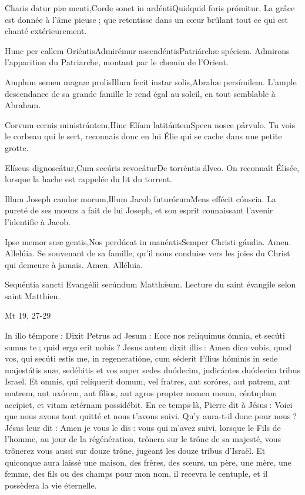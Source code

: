 \begin{paracol}{2}
Charis datur piæ menti,Corde sonet in ardéntiQuidquid foris prómitur.
\switchcolumn
La grâce est donnée à l’âme pieuse ; que retentisse dans un cœur brûlant tout ce qui est chanté extérieurement.
\switchcolumn*

Hunc per callem OriéntisAdmirémur ascendéntisPatriárchæ spéciem.
\switchcolumn
Admirons l’apparition du Patriarche, montant par le chemin de l’Orient.
\switchcolumn*

Amplum semen magnæ prolisIllum fecit instar solis,Abrahæ persímilem.
\switchcolumn
L’ample descendance de sa grande famille le rend égal au soleil, en tout semblable à Abraham.
\switchcolumn*

Corvum cernis ministrántem,Hinc Elíam latitántemSpecu nosce párvulo.
\switchcolumn
Tu vois le corbeau qui le sert, reconnais donc en lui Élie qui se cache dans une petite grotte.
\switchcolumn*

Elíseus dignoscátur,Cum secúris revocáturDe torréntis álveo.
\switchcolumn
On reconnaît Élisée, lorsque la hache est rappelée du lit du torrent.
\switchcolumn*

Illum Joseph candor morum,Illum Jacob futurórumMens effécit cónscia.
\switchcolumn
La pureté de ses mœurs a fait de lui Joseph, et son esprit connaissant l’avenir l’identifie à Jacob.
\switchcolumn*

Ipse memor suæ gentis,Nos perdúcat in manéntisSemper Christi gáudia. Amen. Allelúia.
\switchcolumn
Se souvenant de sa famille, qu’il nous conduise vers les joies du Christ qui demeure à jamais. Amen. Alléluia.
\switchcolumn*

Sequéntia sancti Evangélii secúndum Matthǽum.
\switchcolumn
Lecture du saint évangile selon saint Matthieu.
\switchcolumn*

Mt 19, 27-29
\switchcolumn

\switchcolumn*

In illo témpore : Dixit Petrus ad  Jesum : Ecce nos relíquimus ómnia, et secúti sumus te ; quid ergo erit nobis ? Jesus autem dixit illis : Amen dico vobis, quod vos, qui secúti estis me, in regeneratióne, cum séderit Fílius hóminis in sede majestátis suæ, sedébitis et vos super sedes duódecim, judicántes duódecim tribus Israel. Et omnis, qui relíquerit domum, vel fratres, aut soróres, aut patrem, aut matrem, aut uxórem, aut fílios, aut agros propter nomen meum, céntuplum accípiet, et vitam ætérnam possidébit.
\switchcolumn
En ce temps-là, Pierre dit à Jésus : Voici  que nous avons tout quitté et nous t’avons suivi. Qu’y aura-t-il donc pour nous ? Jésus leur dit : Amen je vous le dis : vous qui m’avez suivi, lorsque le Fils de l’homme, au jour de la régénération, trônera sur le trône de sa majesté, vous trônerez vous aussi sur douze trône, jugeant les douze tribus d’Israël. Et quiconque aura laissé une maison, des frères, des sœurs, un père, une mère, une femme, des fils ou des champs pour mon nom, il recevra le centuple, et il possèdera la vie éternelle.
\switchcolumn*


\end{paracol}
